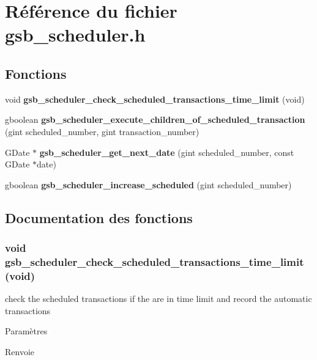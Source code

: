 \section{Référence du fichier gsb\_\-scheduler.h}
\label{gsb__scheduler_8h}
\subsection*{Fonctions}
\begin{DoxyCompactItemize}
\item 
void {\bf gsb\_\-scheduler\_\-check\_\-scheduled\_\-transactions\_\-time\_\-limit} (void)
\item 
gboolean {\bf gsb\_\-scheduler\_\-execute\_\-children\_\-of\_\-scheduled\_\-transaction} (gint scheduled\_\-number, gint transaction\_\-number)
\item 
GDate $\ast$ {\bf gsb\_\-scheduler\_\-get\_\-next\_\-date} (gint scheduled\_\-number, const GDate $\ast$date)
\item 
gboolean {\bf gsb\_\-scheduler\_\-increase\_\-scheduled} (gint scheduled\_\-number)
\end{DoxyCompactItemize}


\subsection{Documentation des fonctions}
\subsubsection[{gsb\_\-scheduler\_\-check\_\-scheduled\_\-transactions\_\-time\_\-limit}]{\setlength{\rightskip}{0pt plus 5cm}void gsb\_\-scheduler\_\-check\_\-scheduled\_\-transactions\_\-time\_\-limit (void)}\label{gsb__scheduler_8h_a01be712269ce407b49b2d995af85f2bf}
check the scheduled transactions if the are in time limit and record the automatic transactions


\begin{DoxyParams}{Paramètres}
\item[{\em }]\end{DoxyParams}
\begin{DoxyReturn}{Renvoie}

\end{DoxyReturn}


